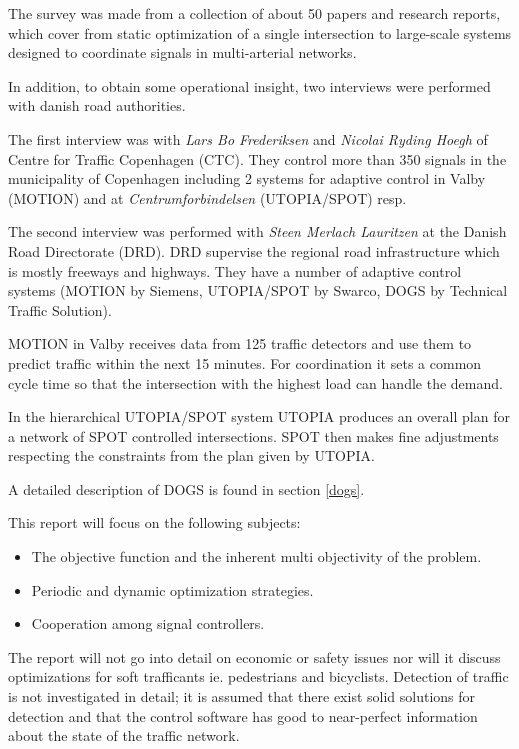\label{scope}

The survey was made from a collection of about 50 papers and research reports, which cover from static optimization of a single intersection to large-scale systems designed to coordinate signals in multi-arterial networks. 

In addition, to obtain some operational insight, two interviews were performed with danish road authorities. 

The first interview was with \textit{Lars Bo Frederiksen} and \textit{Nicolai Ryding Hoegh} of Centre for Traffic Copenhagen (CTC). They control more than 350 signals in the municipality of Copenhagen including 2 systems for adaptive control in Valby (MOTION) and at \textit{Centrumforbindelsen} (UTOPIA/SPOT) resp. 

The second interview was performed with \textit{Steen Merlach Lauritzen} at the Danish Road Directorate (DRD). DRD supervise the regional road infrastructure which is mostly freeways and highways. They have a number of adaptive control systems (MOTION by Siemens, UTOPIA/SPOT by Swarco, DOGS by Technical Traffic Solution).

MOTION in Valby receives data from 125 traffic detectors and use them to predict traffic within the next 15 minutes. For coordination it sets a common cycle time so that the intersection with the highest load can handle the demand.

In the hierarchical UTOPIA/SPOT system UTOPIA produces an overall plan for a network of SPOT controlled intersections. SPOT then makes fine adjustments respecting the constraints from the plan given by UTOPIA.

A detailed description of DOGS is found in section \ref{dogs}.

This report will focus on the following subjects:

\begin{itemize}
\item The objective function and the inherent multi objectivity of the problem.
\item Periodic and dynamic optimization strategies.
\item Cooperation among signal controllers.
\end{itemize}

The report will not go into detail on economic or safety issues nor will it discuss optimizations for soft trafficants ie. pedestrians and bicyclists. Detection of traffic is not investigated in detail; it is assumed that there exist solid solutions for detection and that the control software has good to near-perfect information about the state of the traffic network.
